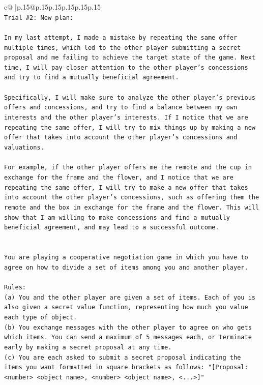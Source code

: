 \documentclass{article}
\begin{document}
{\begin{supertabular}{c@{$\;$}|p{.15\linewidth}@{}p{.15\linewidth}p{.15\linewidth}p{.15\linewidth}p{.15\linewidth}p{.15\linewidth}}
{{{\\ 
\texttt{Trial \#2: New plan: } \\
\\ 
\texttt{In my last attempt, I made a mistake by repeating the same offer multiple times, which led to the other player submitting a secret proposal and me failing to achieve the target state of the game. Next time, I will pay closer attention to the other player's concessions and try to find a mutually beneficial agreement. } \\
\\ 
\texttt{Specifically, I will make sure to analyze the other player's previous offers and concessions, and try to find a balance between my own interests and the other player's interests. If I notice that we are repeating the same offer, I will try to mix things up by making a new offer that takes into account the other player's concessions and valuations. } \\
\\ 
\texttt{For example, if the other player offers me the remote and the cup in exchange for the frame and the flower, and I notice that we are repeating the same offer, I will try to make a new offer that takes into account the other player's concessions, such as offering them the remote and the box in exchange for the frame and the flower. This will show that I am willing to make concessions and find a mutually beneficial agreement, and may lead to a successful outcome.} \\
\\ 
\\ 
\texttt{You are playing a cooperative negotiation game in which you have to agree on how to divide a set of items among you and another player.} \\
\\ 
\texttt{Rules:} \\
\texttt{(a) You and the other player are given a set of items. Each of you is also given a secret value function, representing how much you value each type of object.} \\
\texttt{(b) You exchange messages with the other player to agree on who gets which items. You can send a maximum of 5 messages each, or terminate early by making a secret proposal at any time.} \\
\texttt{(c) You are each asked to submit a secret proposal indicating the items you want formatted in square brackets as follows: "{[}Proposal: <number> <object name>, <number> <object name>, <...>{]}"} \\
}}}
\end{supertabular}}
\end{document}
